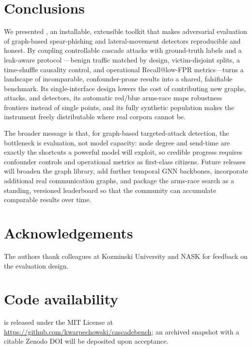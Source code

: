 \section{Conclusions}
\label{sec:conclusion}

We presented \tool, an installable, extensible toolkit that makes adversarial evaluation of
graph-based spear-phishing and lateral-movement detectors reproducible and honest. By
coupling controllable cascade attacks with ground-truth labels and a leak-aware protocol
---benign traffic matched by design, victim-disjoint splits, a time-shuffle causality
control, and operational Recall@low-FPR metrics---\tool turns a landscape of incomparable,
confounder-prone results into a shared, falsifiable benchmark. Its single-interface design
lowers the cost of contributing new graphs, attacks, and detectors, its automatic red/blue
arms-race maps robustness frontiers instead of single points, and its fully synthetic
population makes the instrument freely distributable where real corpora cannot be.

The broader message is that, for graph-based targeted-attack detection, the bottleneck is
evaluation, not model capacity: node degree and send-time are exactly the shortcuts a
powerful model will exploit, so credible progress requires confounder controls and
operational metrics as first-class citizens. Future releases will broaden the graph library,
add further temporal GNN backbones, incorporate additional real communication graphs, and
package the arms-race search as a standing, versioned leaderboard so that the community can
accumulate comparable results over time.

\section*{Acknowledgements}
The authors thank colleagues at Kozminski University and NASK for feedback on the evaluation
design.

\section*{Code availability}
\tool is released under the MIT License at \url{https://github.com/kwarpechowski/cascadebench};
an archived snapshot with a citable Zenodo DOI will be deposited upon acceptance.